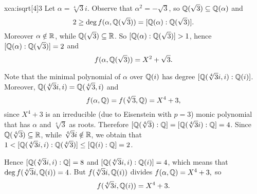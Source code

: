 \begin{sol}{xca:isqrt[4]3}
Let $\alpha=\sqrt[4]{3}i$. Observe that $\alpha^2 = -\sqrt{3}$,
so $\mathbb{Q}(\sqrt{3})\subseteq \mathbb{Q}(\alpha)$ and 
\[
2\geq \deg f(\alpha,\mathbb{Q}(\sqrt{3}))=[\mathbb{Q}(\alpha):\mathbb{Q}(\sqrt{3})].
\]
Moreover $\alpha\notin\mathbb{R}$,
while $\mathbb{Q}(\sqrt{3})\subseteq \mathbb{R}$.
So $[\mathbb{Q}(\alpha):\mathbb{Q}(\sqrt{3})]>1$, 
hence $[\mathbb{Q}(\alpha):\mathbb{Q}(\sqrt{3})]=2$ and 
$$f(\alpha,\mathbb{Q}(\sqrt{3}))=X^2+\sqrt{3}.$$

Note that the minimal polynomial of $\alpha$
over $\mathbb{Q}(i)$ has degree $[\mathbb{Q}(\sqrt[4]{3}i,i):\mathbb{Q}(i)]$.
Moreover, $\mathbb{Q}(\sqrt[4]{3}i,i)=\mathbb{Q}(\sqrt[4]{3},i)$ and
$$f(\alpha,\mathbb{Q})=f(\sqrt[4]{3},\mathbb{Q})=X^4+3,$$
since $X^4+3$ is an irreducible
(due to Eisenstein with $p=3$)
monic polynomial that has $\alpha$ and $\sqrt[4]{3}$
as roots.
Therefore $[\mathbb{Q}(\sqrt[4]{3}):\mathbb{Q}]=[\mathbb{Q}(\sqrt[4]{3}i):\mathbb{Q}]=4$.
Since $\mathbb{Q}(\sqrt[4]{3})\subseteq\mathbb{R}$, while $\sqrt[4]{3}i\notin\mathbb{R}$,
we obtain that $1<[\mathbb{Q}(\sqrt[4]{3}i,i):\mathbb{Q}(\sqrt[4]{3})]\leq [\mathbb{Q}(i):\mathbb{Q}]=2$.
\begin{center}
    \end{center}
Hence $[\mathbb{Q}(\sqrt[4]{3}i,i):\mathbb{Q}]=8$ and $[\mathbb{Q}(\sqrt[4]{3}i,i):\mathbb{Q}(i)]=4$, which means that $\deg f(\sqrt[4]{3}i,\mathbb{Q}(i))=4$.
But $f(\sqrt[4]{3}i,\mathbb{Q}(i))$ divides $f(\alpha,\mathbb{Q})=X^4+3,$ so
$$f(\sqrt[4]{3}i,\mathbb{Q}(i))=X^4+3.$$
\end{sol}


